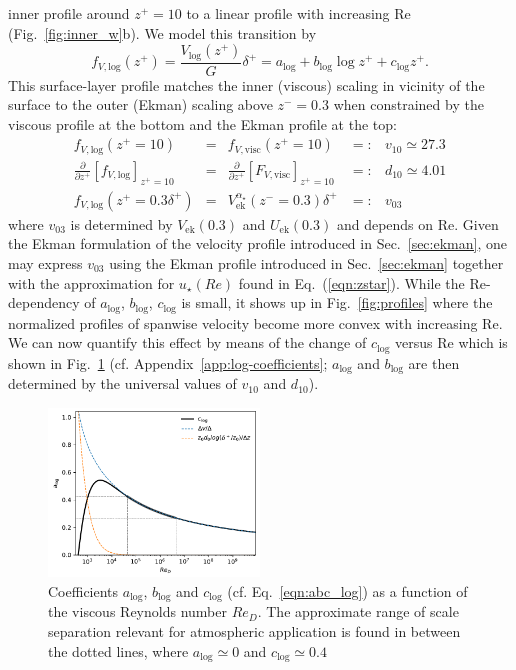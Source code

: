 \documentclass[smallcondensed,final]{svjour3}
\newcommand{\p}{\partial}
\newcommand{\RE}{\mathrm{Re}}
\begin{document}
inner profile around $z^+=10$ to a linear profile with increasing $\RE$ (Fig.~\ref{fig:inner_w}b).
%
We model this transition by 
%
\begin{equation}
  f_{V,\mathrm{log}}(z^+) = \frac{V_\mathrm{log}(z^+)}{G} \delta^+ = a_\mathrm{log} + b_\mathrm{log} \log z^+ + c_\mathrm{log} z^+. 
  \label{eqn:abc_log}
\end{equation} 
%
This surface-layer profile matches the inner (viscous) scaling in vicinity of the surface to the outer
(Ekman) scaling above $z^-=0.3$ when constrained by the viscous profile at the bottom and the
Ekman profile at the top:
%
\begin{align}
  f_{V,\mathrm{log}}(z^+=10) &=& f_{V,\mathrm{visc}}(z^+=10) &=:& v_{10} \simeq 27.3\\
  \frac{\p}{\p z^+} \left[ f_{V,\mathrm{log}}\right]_{z^+=10} &=& \frac{\p}{\p z^+}\left[ F_{V,\mathrm{visc}}\right]_{z^+=10} &=:&d_{10}\simeq 4.01 \\
  f_{V,\mathrm{log}}(z^+=0.3\delta^+) &=& V^{\alpha_\star}_\mathrm{ek}(z^-=0.3)\delta^+&=:& v_{03} 
\end{align}
where $v_{03}$ is determined by $V_\mathrm{ek}(0.3)$ and $U_\mathrm{ek}(0.3)$ and depends on $\RE$.
%
Given the Ekman formulation of the velocity profile introduced in Sec.~\ref{sec:ekman},
one may express $v_{03}$ using the Ekman profile introduced in Sec.~\ref{sec:ekman} together
with the approximation for $u_\star(Re)$ found in Eq.~(\ref{eqn:zstar}). 
% 
%
While the $\RE$-dependency of $a_\mathrm{log}$, $b_\mathrm{log}$, $c_\mathrm{log}$
is small, it shows up in Fig.~\ref{fig:profiles} where the normalized profiles
of spanwise velocity become more convex with increasing $\RE$.
%
We can now quantify this effect by means of the change of $c_\mathrm{log}$ versus $\RE$ which is shown in
Fig.~\ref{fig:clog} (cf. Appendix~\ref{app:log-coefficients};
$a_\mathrm{log}$ and $b_\mathrm{log}$ are then determined by the universal
values of $v_{10}$ and $d_{10}$).
%
%
\begin{figure}
  \centerline{\includegraphics[width=0.5\textwidth]{../plot/c_log.pdf}}
  \caption{Coefficients $a_\text{log}$, $b_\text{log}$ and $c_\text{log}$ 
    (cf. Eq.~\ref{eqn:abc_log}) 
    as a function of 
    the viscous Reynolds number $Re_D$. The approximate range of scale separation relevant for atmospheric application 
    is found in between the dotted lines, where $a_\text{log}\simeq 0$ and $c_\text{log}\simeq 0.4$ }
  \label{fig:clog}
\end{figure} 
%
\end{document}
